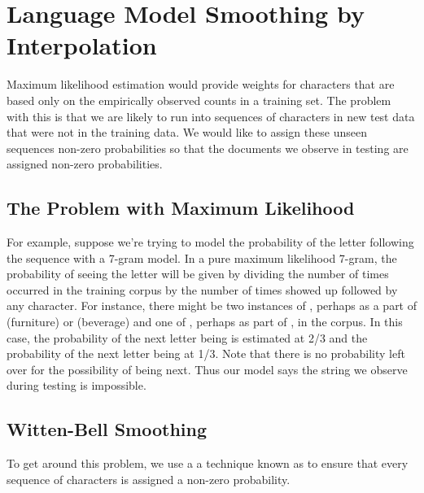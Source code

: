 \section{Language Model Smoothing by Interpolation}\label{section:char-lm-smoothing}

Maximum likelihood estimation would provide weights for characters
that are based only on the empirically observed counts in a training
set.  The problem with this is that we are likely to run into
sequences of characters in new test data that were not in the training
data.  We would like to assign these unseen sequences non-zero
probabilities so that the documents we observe in testing are assigned
non-zero probabilities.

\subsection{The Problem with Maximum Likelihood}

For example, suppose we're trying to model the probability of the
letter  following the sequence  with a 7-gram model.  In a pure maximum likelihood 7-gram, the
probability of seeing the letter  will be given by
dividing the number of times  occurred in the
training corpus by the number of times  showed
up followed by any character.  For instance, there might be two
instances of , perhaps as a part of
 (furniture) or 
(beverage) and one of , perhaps as part of
, in the corpus.  In this case, the
probability of the next letter being  is estimated at
2/3 and the probability of the next letter being  at
1/3.  Note that there is no probability left over for the possibility
of  being next.  Thus our model says the string we
observe during testing is impossible.  

\subsection{Witten-Bell Smoothing}

To get around this problem, we use a a technique known as
 to ensure that every sequence of
characters is assigned a non-zero probability.  

